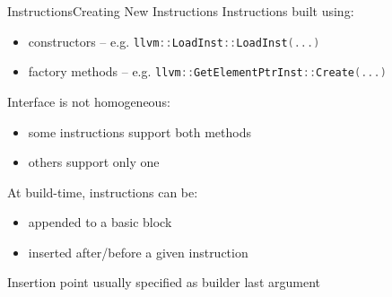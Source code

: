 \documentclass[10pt,mathserif]{beamer}
\newcommand{\cppinline}[1]{\lstinline[language=C++]!#1!}
\begin{document}
\begin{frame}{Instructions}{Creating New Instructions}
Instructions built using:

\begin{itemize}
\item constructors -- e.g. \cppinline{llvm::LoadInst::LoadInst(...)}
\item factory methods -- e.g. \cppinline{llvm::GetElementPtrInst::Create(...)}
\end{itemize}

Interface is not homogeneous:

\begin{itemize}
\item some instructions support both methods
\item others support only one
\end{itemize}

At build-time, instructions can be:

\begin{itemize}
\item appended to a basic block
\item inserted after/before a given instruction
\end{itemize}

Insertion point usually specified as builder last argument
\end{frame}
\end{document}
